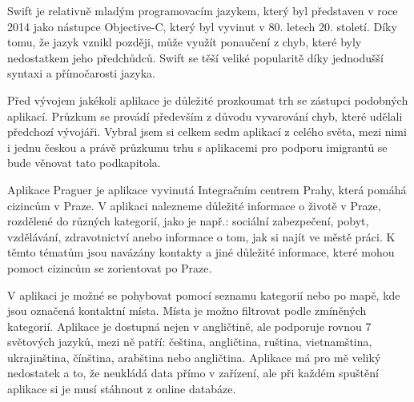 \par

Swift je relativně mladým programovacím jazykem, který byl představen v roce 2014 jako nástupce Objective-C, který byl vyvinut v 80. letech 20. století. Díky tomu, že jazyk vznikl později, může využít ponaučení z chyb, které byly nedostatkem jeho předchůdců. Swift se těší veliké popularitě díky jednodušší syntaxi a přímočarosti jazyka.


























Před vývojem jakékoli aplikace je důležité prozkoumat trh se zástupci podobných aplikací. Průzkum se provádí především z důvodu vyvarování chyb, které udělali předchozí vývojáři. Vybral jsem si celkem sedm aplikací z celého světa, mezi nimi i jednu českou a právě průzkumu trhu s aplikacemi pro podporu imigrantů se bude věnovat tato podkapitola.




Aplikace Praguer je aplikace vyvinutá Integračním centrem Prahy,  která pomáhá cizincům v Praze. V aplikaci nalezneme důležité informace o životě v Praze, rozdělené do různých kategorií, jako je např.: sociální zabezpečení, pobyt, vzdělávání, zdravotnictví anebo informace o tom, jak si najít ve městě práci. K těmto tématům jsou navázány kontakty a jiné důležité informace, které mohou pomoct cizincům se zorientovat po Praze.
\par
V aplikaci je možné se pohybovat pomocí seznamu kategorií nebo po mapě, kde jsou označená kontaktní místa. Místa je možno filtrovat podle zmíněných kategorií. Aplikace je dostupná nejen v angličtině, ale podporuje rovnou 7 světových jazyků, mezi ně patří: čeština, angličtina, ruština, vietnamština, ukrajinština, čínština, arabština nebo angličtina. Aplikace má pro mě veliký nedostatek a to, že neukládá data přímo v zařízení, ale při každém spuštění aplikace si je musí stáhnout z online databáze.

